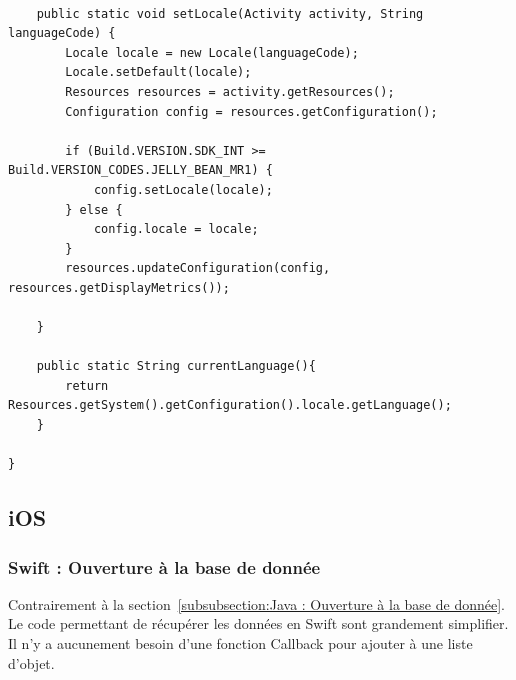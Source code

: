\documentclass{article}
\begin{document}
\begin{verbatim}
   
    public static void setLocale(Activity activity, String languageCode) {
        Locale locale = new Locale(languageCode);
        Locale.setDefault(locale);
        Resources resources = activity.getResources();
        Configuration config = resources.getConfiguration();
        
        if (Build.VERSION.SDK_INT >= Build.VERSION_CODES.JELLY_BEAN_MR1) {
            config.setLocale(locale);
        } else {
            config.locale = locale;
        }
        resources.updateConfiguration(config, resources.getDisplayMetrics());

    }

    public static String currentLanguage(){
        return Resources.getSystem().getConfiguration().locale.getLanguage();
    }

}\end{verbatim}



\subsection{iOS} %
\label{subsection:iOS} 


\subsubsection{Swift : Ouverture à la base de donnée}
\label{subsubsection:Swift : Ouverture à la base de donnée} 
Contrairement à la section~\ref{subsubsection:Java : Ouverture à la base de donnée}. Le code permettant de récupérer les données
en Swift sont grandement simplifier. Il n'y a aucunement besoin d'une fonction Callback pour ajouter à une liste d'objet.
\end{document}

